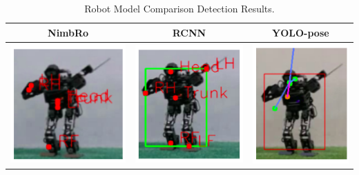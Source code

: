 \begin{longtable}{|c|c|c|}
  \caption{Robot Model Comparison Detection Results.}
  \label{tb:robotmodelcomparisondetectionresults}\\
  \hline
  \rowcolor[HTML]{C0C0C0}
  \textbf{NimbRo}    & \textbf{RCNN} & \textbf{YOLO-pose}\\
  \hline
  \includegraphics{gambar/nimbro-1.png} & \includegraphics{gambar/rcnn-1.png} & \includegraphics{gambar/yolo-1.png} \\
  \hline

\end{longtable}
